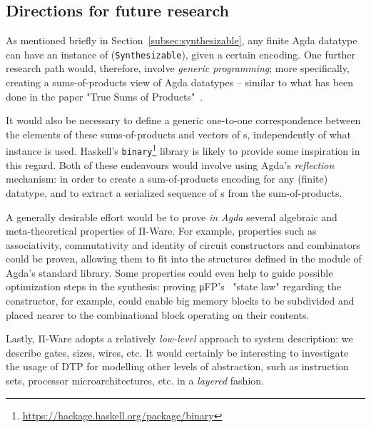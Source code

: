         \subsection{Directions for future research}
        \label{subsec:future-research}
            As mentioned briefly in Section~\ref{subsec:synthesizable}, any finite Agda datatype can have
            an instance of  (\texttt{Synthesizable}), given a certain encoding.
            One further research path would, therefore, involve \emph{generic programming};
            more specifically, creating a sums-of-products view of Agda datatypes – similar to
            what has been done in the paper "True Sums of Products"~\cite{true-sop}.

            It would also be necessary to define a generic one-to-one correspondence
            between the elements of these sums-of-products and vectors of s,
            independently of what  instance is used.
            Haskell's \texttt{binary}\footnote{\url{https://hackage.haskell.org/package/binary}}
            library is likely to provide some inspiration in this regard.
            Both of these endeavours would involve using Agda's
            \emph{reflection}~\cite{engineering-reflection-agda} mechanism:
            in order to create a sum-of-products encoding for any (finite) datatype,
            and to extract a serialized sequence of s from the sum-of-products.

            A generally desirable effort would be to prove \emph{in Agda} several
            algebraic and meta-theoretical properties of Π-Ware.
            For example, properties such as associativity, commutativity and identity of
            circuit constructors and combinators could be proven, allowing them to fit into
            the structures defined in the  module of Agda's standard library.
            Some properties could even help to guide possible optimization steps in the synthesis:
            proving μFP's~\cite{mufp-1984} "state law" regarding the  constructor,
            for example, could enable big memory blocks to be subdivided and placed nearer
            to the combinational block operating on their contents.

            Lastly, Π-Ware adopts a relatively \emph{low-level} approach to system description:
            we describe gates, sizes, wires, etc. It would certainly be interesting to investigate
            the usage of \acl{DTP} for modelling other levels of abstraction, such as
            instruction sets, processor microarchitectures, etc. in a \emph{layered} fashion.
